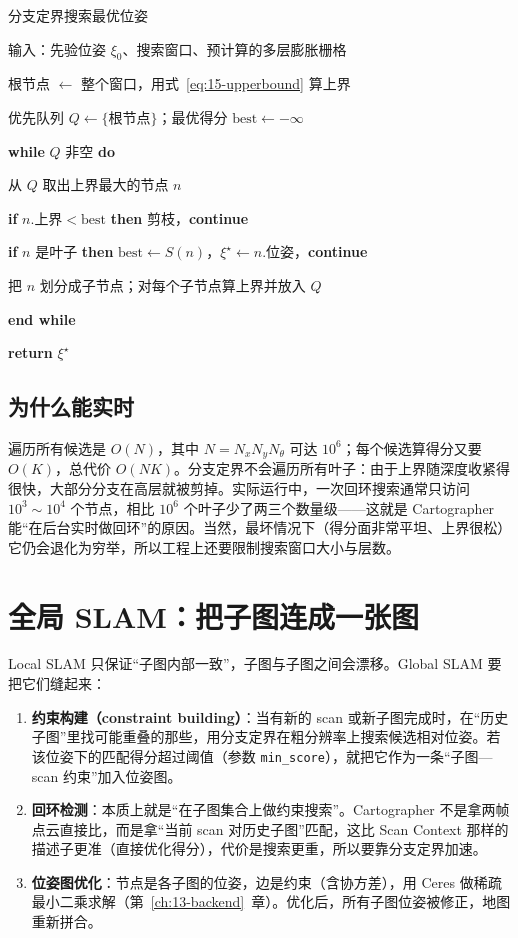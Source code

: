 \begin{pseudo}{分支定界搜索最优位姿}
  \item 输入：先验位姿 $\xi_0$、搜索窗口、预计算的多层膨胀栅格
  \item 根节点 $\leftarrow$ 整个窗口，用式~\eqref{eq:15-upperbound} 算上界
  \item 优先队列 $Q\leftarrow\{\text{根节点}\}$；最优得分 $\mathrm{best}\leftarrow-\infty$
  \item \textbf{while} $Q$ 非空 \textbf{do}
  \item \quad 从 $Q$ 取出上界最大的节点 $n$
  \item \quad \textbf{if} $n.\text{上界}<\mathrm{best}$ \textbf{then} 剪枝，\textbf{continue}
  \item \quad \textbf{if} $n$ 是叶子 \textbf{then} $\mathrm{best}\leftarrow S(n)$，$\xi^{\star}\leftarrow n.\text{位姿}$，\textbf{continue}
  \item \quad 把 $n$ 划分成子节点；对每个子节点算上界并放入 $Q$
  \item \textbf{end while}
  \item \textbf{return} $\xi^{\star}$
\end{pseudo}

\subsection{为什么能实时}

遍历所有候选是 $O(N)$，其中 $N=N_xN_yN_\theta$ 可达 $10^{6}$；每个候选算得分又要 $O(K)$，总代价 $O(NK)$。分支定界不会遍历所有叶子：由于上界随深度收紧得很快，大部分分支在高层就被剪掉。实际运行中，一次回环搜索通常只访问 $10^{3}\sim10^{4}$ 个节点，相比 $10^{6}$ 个叶子少了两三个数量级——这就是 Cartographer 能``在后台实时做回环''的原因。当然，最坏情况下（得分面非常平坦、上界很松）它仍会退化为穷举，所以工程上还要限制搜索窗口大小与层数。

\section{全局 SLAM：把子图连成一张图}\label{sec:15-global}

Local SLAM 只保证``子图内部一致''，子图与子图之间会漂移。Global SLAM 要把它们缝起来：

\begin{enumerate}
  \item \textbf{约束构建（constraint building）}：当有新的 scan 或新子图完成时，在``历史子图''里找可能重叠的那些，用分支定界在粗分辨率上搜索候选相对位姿。若该位姿下的匹配得分超过阈值（参数 \lstinline{min_score}），就把它作为一条``子图—scan 约束''加入位姿图。
  \item \textbf{回环检测}：本质上就是``在子图集合上做约束搜索''。Cartographer 不是拿两帧点云直接比，而是拿``当前 scan 对历史子图''匹配，这比 Scan Context 那样的描述子更准（直接优化得分），代价是搜索更重，所以要靠分支定界加速。
  \item \textbf{位姿图优化}：节点是各子图的位姿，边是约束（含协方差），用 Ceres\cite{hess2016cartographer} 做稀疏最小二乘求解（第~\ref{ch:13-backend}~章）。优化后，所有子图位姿被修正，地图重新拼合。
\end{enumerate}

